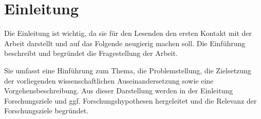 

\section{Einleitung}

Die Einleitung ist wichtig, da sie für den Lesenden den ersten Kontakt mit der Arbeit darstellt und auf das Folgende neugierig machen soll. Die Einführung beschreibt und begründet die 
Fragestellung der Arbeit. 

Sie umfasst eine Hinführung zum Thema, die Problemstellung, die Zielsetzung der vorliegenden wissenschaftlichen Auseinandersetzung sowie eine Vorgehensbeschreibung. Aus dieser Darstellung werden in der Einleitung Forschungsziele und ggf. Forschungshypothesen hergeleitet und die Relevanz der Forschungsziele begründet. \parencite{brooksbankCognitiveDissonanceRevisited2020}

\newpage